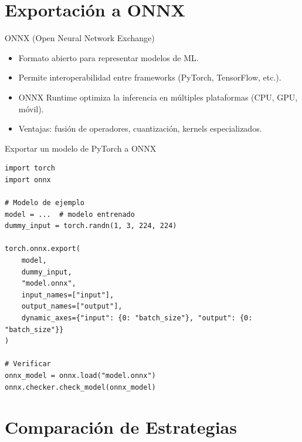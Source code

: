 \documentclass[aspectratio=169, 10pt, xcolor=table]{beamer}
\begin{document}
\section{Exportación a ONNX}

\begin{frame}{ONNX (Open Neural Network Exchange)}
    \begin{itemize}
        \item Formato abierto para representar modelos de ML.
        \item Permite interoperabilidad entre frameworks (PyTorch, TensorFlow, etc.).
        \item ONNX Runtime optimiza la inferencia en múltiples plataformas (CPU, GPU, móvil).
        \item Ventajas: fusión de operadores, cuantización, kernels especializados.
    \end{itemize}
\end{frame}

\begin{frame}[fragile]{Exportar un modelo de PyTorch a ONNX}
    \begin{lstlisting}
import torch
import onnx

# Modelo de ejemplo
model = ...  # modelo entrenado
dummy_input = torch.randn(1, 3, 224, 224)

torch.onnx.export(
    model,
    dummy_input,
    "model.onnx",
    input_names=["input"],
    output_names=["output"],
    dynamic_axes={"input": {0: "batch_size"}, "output": {0: "batch_size"}}
)

# Verificar
onnx_model = onnx.load("model.onnx")
onnx.checker.check_model(onnx_model)
    \end{lstlisting}
\end{frame}

\section{Comparación de Estrategias}
\end{document}

